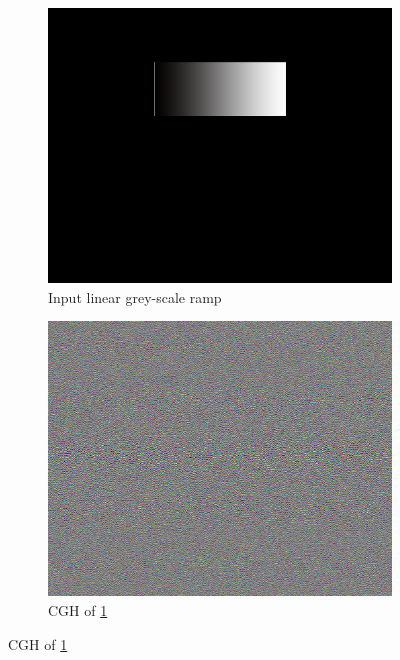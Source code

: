 \begin{figure}[H]
  \centering
  \begin{subfigure}[c]{0.32\textwidth}
    \includegraphics[width=\textwidth]{grey-scale-test.png}
    \caption{Input linear grey-scale ramp}\label{fig:grey-scale-test}
  \end{subfigure}
  \hfill
  \begin{subfigure}[c]{0.32\textwidth}
    \includegraphics[width=\textwidth]{Holo_linear_ramp.png}
    \caption{CGH of \cref{fig:grey-scale-test}}\label{fig:Holo_linear_ramp}
  \end{subfigure}
  \hfill

\end{figure}
